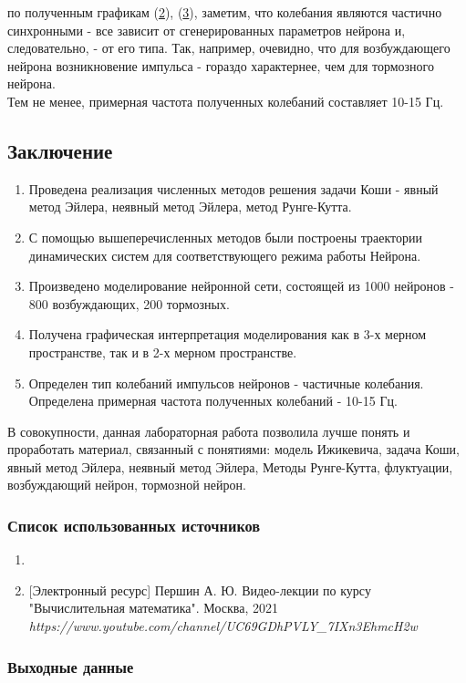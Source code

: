  по полученным графикам (\hyperlink{3d}{2}), (\hyperlink{2d}{3}), заметим, что колебания являются частично синхронными - все зависит от сгенерированных параметров нейрона и, следовательно, - от его типа. Так, например, очевидно, что для возбуждающего нейрона возникновение импульса - гораздо характернее, чем для тормозного нейрона. \\
\indent Тем не менее, примерная частота полученных колебаний составляет 10-15 Гц. 
\clearpage
\subsection{Заключение}
\begin{enumerate}
\item Проведена реализация численных методов решения задачи Коши - явный метод Эйлера, неявный метод Эйлера, метод Рунге-Кутта.
\item С помощью вышеперечисленных методов были построены траектории динамических систем для соответствующего режима работы Нейрона.
\item Произведено моделирование нейронной сети, состоящей из 1000 нейронов - 800 возбуждающих, 200 тормозных.
\item Получена графическая интерпретация моделирования как в 3-х мерном пространстве, так и в 2-х мерном пространстве.
\item Определен тип колебаний импульсов нейронов - частичные колебания. Определена примерная частота полученных колебаний - 10-15 Гц.
\end{enumerate}
\hspace*{\parindent}В совокупности, данная лабораторная работа позволила лучше понять и проработать материал, связанный с понятиями: модель Ижикевича, задача Коши, явный метод Эйлера, неявный метод Эйлера, Методы Рунге-Кутта, флуктуации, возбуждающий нейрон, тормозной нейрон.

\subsubsection*{Список использованных источников}

\begin{enumerate}
	\item {}
    \item \textrm{[Электронный ресурс]} Першин А. Ю. Видео-лекции по курсу "Вычислительная математика". Москва, 2021
    \textit{https://www.youtube.com/channel/UC69GDhPVLY_7IXn3EhmcH2w}
\end{enumerate}

\subsubsection*{Выходные данные}

\textit{\DocOutReference}

